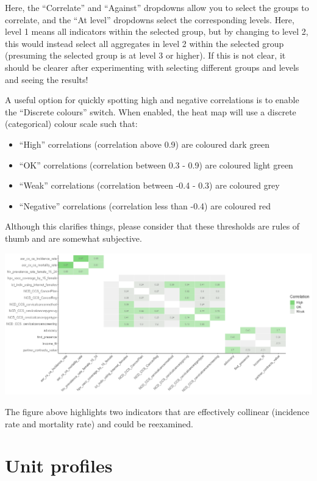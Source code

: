 \documentclass[
  letterpaper,
  DIV=11,
  numbers=noendperiod]{scrreprt}
\providecommand{\tightlist}{%
  \setlength{\itemsep}{0pt}\setlength{\parskip}{0pt}}\usepackage{longtable,booktabs,array}
\begin{document}
Here, the ``Correlate'' and ``Against'' dropdowns allow you to select
the groups to correlate, and the ``At level'' dropdowns select the
corresponding levels. Here, level 1 means all indicators within the
selected group, but by changing to level 2, this would instead select
all aggregates in level 2 within the selected group (presuming the
selected group is at level 3 or higher). If this is not clear, it should
be clearer after experimenting with selecting different groups and
levels and seeing the results!

A useful option for quickly spotting high and negative correlations is
to enable the ``Discrete colours'' switch. When enabled, the heat map
will use a discrete (categorical) colour scale such that:

\begin{itemize}
\tightlist
\item
  ``High'' correlations (correlation above 0.9) are coloured dark green
\item
  ``OK'' correlations (correlation between 0.3 - 0.9) are coloured light
  green
\item
  ``Weak'' correlations (correlation between -0.4 - 0.3) are coloured
  grey
\item
  ``Negative'' correlations (correlation less than -0.4) are coloured
  red
\end{itemize}

Although this clarifies things, please consider that these thresholds
are rules of thumb and are somewhat subjective.

\includegraphics[width=1\textwidth,height=\textheight]{figs/correlations_3.png}

The figure above highlights two indicators that are effectively
collinear (incidence rate and mortality rate) and could be reexamined.

\hypertarget{sec-profiles}{%
\chapter{Unit profiles}\label{sec-profiles}}
\end{document}
